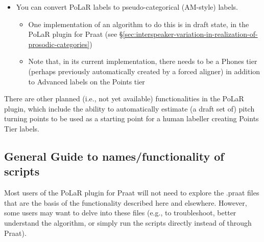 \begin{itemize}
\begin{itemize}
\begin{itemize}
			\end{itemize}
		\item Running this tool can be done from the Objects window or an Editor window.
		\begin{itemize}
			\item It can be run on objects loaded into Praat (either from the Objects window or an Editor window): it outputs text that can be copy-pasted into a spreadsheet\footnote{If copy-pasting into an Excel spreadsheet doesn’t separate values across columns, try using “Paste Special” and choose “Unicode Text”.} or into a text file (and then saved as a .tsv [tab separated values] file).
			\item It can be run on all .wav and .TextGrids in a directory (which must have exactly matching file names) by choosing “PoLaR: Extract PoLaR info from files in a directory” from the “New” menu in the Objects window: it outputs data directly into a .tsv file.
			\item Any .tsv file can then be imported into spreadsheet software, fed as input to statistical analysis scripts, or submitted to machine learning algorithms.
		\end{itemize}
	\end{itemize}
	\item You can convert PoLaR labels to pseudo-categorical (AM-style) labels.
	\begin{itemize}
		\item One implementation of an algorithm to do this is in draft state, in the PoLaR plugin for Praat (see §\ref{sec:interspeaker-variation-in-realization-of-prosodic-categories})
		\item Note that, in its current implementation, there needs to be a Phones tier (perhaps previously automatically created by a forced aligner) in addition to Advanced labels on the Points tier
	\end{itemize}
\end{itemize}

There are other planned (i.e., not yet available) functionalities in the PoLaR plugin, which include the ability to automatically estimate (a draft set of) pitch turning points to be used as a starting point for a human labeller creating Points Tier labels. 

\subsection{General Guide to names/functionality of scripts}
Most users of the PoLaR plugin for Praat will not need to explore the .praat files that are the basis of the functionality described here and elsewhere. However, some users may want to delve into these files (e.g., to troubleshoot, better understand the algorithm, or simply run the scripts directly instead of through Praat).

